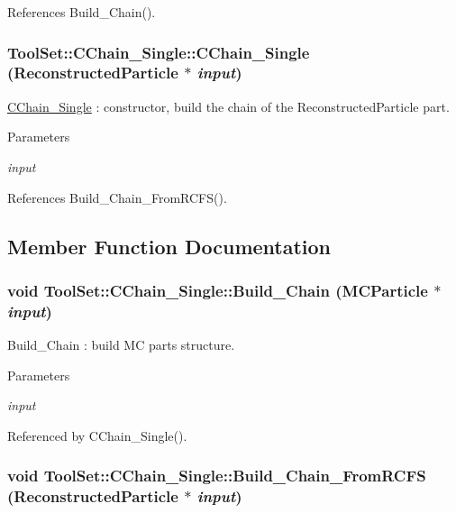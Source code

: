 References Build\_\-Chain().\hypertarget{classToolSet_1_1CChain__Single_a2d0b72a468147b80466db9d5e61d6e70}{
\subsubsection[{CChain\_\-Single}]{\setlength{\rightskip}{0pt plus 5cm}ToolSet::CChain\_\-Single::CChain\_\-Single (ReconstructedParticle $\ast$ {\em input})}}
\label{classToolSet_1_1CChain__Single_a2d0b72a468147b80466db9d5e61d6e70}


\hyperlink{classToolSet_1_1CChain__Single}{CChain\_\-Single} : constructor, build the chain of the ReconstructedParticle part. 
\begin{DoxyParams}{Parameters}
\item[{\em input}]\end{DoxyParams}


References Build\_\-Chain\_\-FromRCFS().

\subsection{Member Function Documentation}
\hypertarget{classToolSet_1_1CChain__Single_a8c4a654be35090013cb5923de100b1bf}{
\subsubsection[{Build\_\-Chain}]{\setlength{\rightskip}{0pt plus 5cm}void ToolSet::CChain\_\-Single::Build\_\-Chain (MCParticle $\ast$ {\em input})}}
\label{classToolSet_1_1CChain__Single_a8c4a654be35090013cb5923de100b1bf}


Build\_\-Chain : build MC parts structure. 
\begin{DoxyParams}{Parameters}
\item[{\em input}]\end{DoxyParams}


Referenced by CChain\_\-Single().\hypertarget{classToolSet_1_1CChain__Single_ac351cca0dcac892111f0110a7be65eac}{
\subsubsection[{Build\_\-Chain\_\-FromRCFS}]{\setlength{\rightskip}{0pt plus 5cm}void ToolSet::CChain\_\-Single::Build\_\-Chain\_\-FromRCFS (ReconstructedParticle $\ast$ {\em input})}}
\label{classToolSet_1_1CChain__Single_ac351cca0dcac892111f0110a7be65eac}


